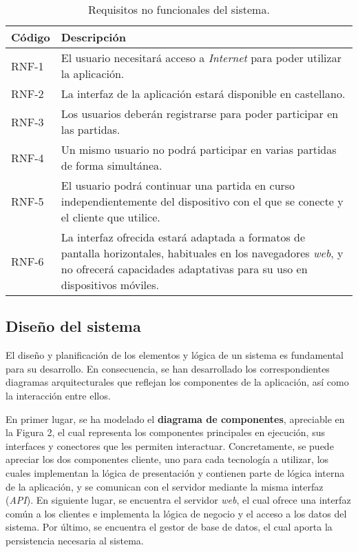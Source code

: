 \documentclass[11pt, a4paper, titlepage]{article}
\begin{document}
\newpage
\begin{table}[h!]
    \centering
    \begin{tabularx}{\textwidth}{|l|X|}
         \hline
         Código & Descripción \\
         \hline
         RNF-1 & El usuario necesitará acceso a \textit{Internet} para poder utilizar la aplicación.\\
         \hline
         RNF-2 & La interfaz de la aplicación estará disponible en castellano.\\
         \hline
         RNF-3 & Los usuarios deberán registrarse para poder participar en las partidas.\\
         \hline
         RNF-4 & Un mismo usuario no podrá participar en varias partidas de forma simultánea. \\
         \hline
         RNF-5 & El usuario podrá continuar una partida en curso independientemente del dispositivo con el que se conecte y el cliente que utilice.\\
         \hline
         RNF-6 & La interfaz ofrecida estará adaptada a formatos de pantalla horizontales, habituales en los navegadores \textit{web}, y no ofrecerá capacidades adaptativas para su uso en dispositivos móviles.\\
         \hline
    \end{tabularx}
    \caption{Requisitos no funcionales del sistema.}
    \label{tab:rnf}
\end{table}

\newpage

\subsection{Diseño del sistema}

El diseño y planificación de los elementos y lógica de un sistema es fundamental para su desarrollo. En consecuencia, se han desarrollado los correspondientes diagramas arquitecturales que reflejan los componentes de la aplicación, así como la interacción entre ellos. \newline

En primer lugar, se ha modelado el \textbf{diagrama de componentes}, apreciable en la Figura 2, el cual representa los componentes principales en ejecución, sus interfaces y conectores que les permiten interactuar. Concretamente, se puede apreciar los dos componentes cliente, uno para cada tecnología a utilizar, los cuales implementan la lógica de presentación y contienen parte de lógica interna de la aplicación, y se comunican con el servidor mediante la misma interfaz (\textit{API}). En siguiente lugar, se encuentra el servidor \textit{web}, el cual ofrece una interfaz común a los clientes e implementa la lógica de negocio y el acceso a los datos del sistema. Por último, se encuentra el gestor de base de datos, el cual aporta la persistencia necesaria al sistema.
\end{document}
